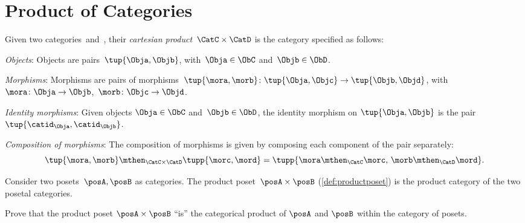 

\section{Product of Categories}



\begin{ctdefinition}
    \label{def:cartesian-product-category}
    Given two categories~\CatC and~\CatD, their \emph{cartesian product}~$\CatC \times \CatD$ is the category specified as follows:
    \begin{compactenum}
        \item \emph{Objects}: Objects are pairs~$\tup{\Obja,\Objb}$, with~$\Obja\in \ObC$ and~$\Objb\in \ObD$.
        \item \emph{Morphisms}: Morphisms are pairs of morphisms~$\tup{\mora,\morb} \colon \tup{\Obja,\Objc}\to \tup{\Objb,\Objd}$, with~$\mora\colon \Obja \to \Objb$,~$\morb\colon \Objc\to \Objd$.
        \item \emph{Identity morphisms}: Given objects $\Obja\in \ObC$ and~$\Objb\in \ObD$, the identity morphism on $\tup{\Obja,\Objb}$ is the pair $\tup{\catid_\Obja ,\catid_\Objb}$.
        \item \emph{Composition of morphisms}: The composition of morphisms is given by composing each component of the pair separately:
        \begin{equation}
            \tup{\mora,\morb}\mthen_{\CatC\times\CatD} \tupp{\morc,\mord}=\tupp{\mora\mthen_{\CatC}\morc,\, \morb \mthen_{\CatD} \mord}.
        \end{equation}
    \end{compactenum}
\end{ctdefinition}


\begin{example}
    Consider two posets~$\posA,\posB$ as categories. The product poset~$\posA\times \posB$ (\cref{def:productposet}) is the product category of the two posetal categories.
\end{example}

\begin{gradedexercise}
    Prove that the product poset $\posA \times \posB$ ``is'' the categorical product of $\posA$ and $\posB$ within the category of posets.
\end{gradedexercise}



